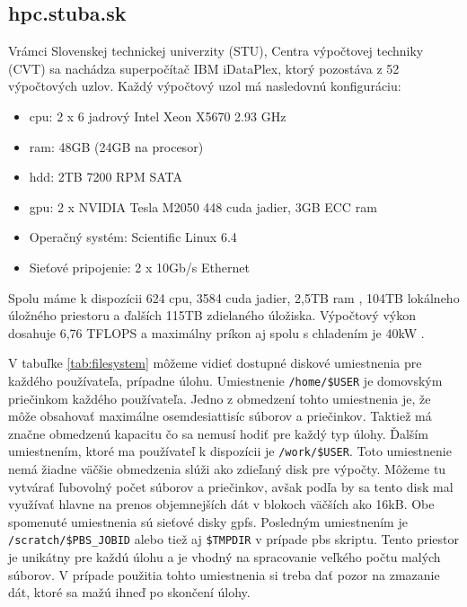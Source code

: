 \subsection{hpc.stuba.sk}
Vrámci Slovenskej technickej univerzity (STU), Centra výpočtovej techniky (CVT) sa nachádza superpočítač IBM iDataPlex, ktorý pozostáva z 52 výpočtových uzlov.
Každý výpočtový uzol má nasledovnú konfiguráciu:
\begin{itemize}
\item \acrshort{cpu}: 2 x 6 jadrový Intel Xeon X5670 2.93 GHz
\item \acrshort{ram}: 48GB (24GB na procesor)
\item \acrshort{hdd}: 2TB 7200 RPM SATA
\item \acrshort{gpu}: 2 x NVIDIA Tesla M2050 448 cuda jadier, 3GB ECC \acrshort{ram}
\item Operačný systém: Scientific Linux 6.4
\item Sieťové pripojenie: 2 x 10Gb/s Ethernet
\end{itemize}
Spolu máme k dispozícii 624 \acrshort{cpu}, 3584 cuda jadier, 2,5TB \acrshort{ram} , 104TB lokálneho úložného priestoru a ďalších 115TB zdielaného úložiska.
Výpočtový výkon dosahuje 6,76 TFLOPS a maximálny príkon aj spolu s chladením je 40kW \cite{hpc}.

V tabuľke \ref{tab:filesystem} môžeme vidieť dostupné diskové umiestnenia pre každého používateľa, prípadne úlohu.
Umiestnenie \texttt{/home/\$USER} je domovským priečinkom každého používateľa.
Jedno z obmedzení tohto umiestnenia je, že môže obsahovať maximálne osemdesiattisíc súborov a priečinkov.
Taktiež má značne obmedzenú kapacitu čo sa nemusí hodiť pre každý typ úlohy.
Ďalším umiestnením, ktoré ma používateľ k dispozícii je \texttt{/work/\$USER}.
Toto umiestnenie nemá žiadne väčšie obmedzenia slúži ako zdieľaný disk pre výpočty.
Môžeme tu vytvárať ľubovolný počet súborov a priečinkov, avšak podľa \cite{hpc} by sa tento disk mal využívať hlavne na prenos objemnejších dát v blokoch väčších ako 16kB. Obe spomenuté umiestnenia sú sieťové disky \acrshort{gpfs}.
Posledným umiestnením je \texttt{/scratch/\$PBS\_JOBID} alebo tiež aj \texttt{\$TMPDIR} v prípade \acrshort{pbs} skriptu.
Tento priestor je unikátny pre každú úlohu a je vhodný na spracovanie veľkého počtu malých súborov.
V prípade použitia tohto umiestnenia si treba dať pozor na zmazanie dát, ktoré sa mažú ihneď po skončení úlohy.

